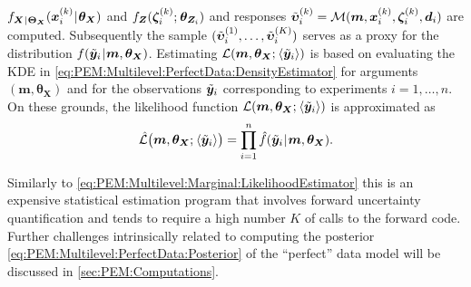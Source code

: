 \(f_{\bm{X} {\:\!}|{\:\!} \bm{\Theta}_{\bm{X}}}(\bm{x}_i^{(k)} {\:\!}|{\:\!} \bm{\theta}_{\bm{X}})\) and \(f_{\bm{Z}}(\bm{\zeta}_i^{(k)} ;{\:\!} \bm{\theta}_{\bm{Z}_i})\)
and responses \(\tilde{\bm{\upsilon}}_i^{(k)} = \mathcal{M}(\bm{m},\bm{x}_i^{(k)},\bm{\zeta}_i^{(k)},\bm{d}_i)\) are computed.
Subsequently the sample \((\tilde{\bm{\upsilon}}_i^{(1)},\ldots,\tilde{\bm{\upsilon}}_i^{(K)})\) serves as a proxy for the distribution \(f (\tilde{\bm{y}}_i {\:\!}|{\:\!} \bm{m},\bm{\theta}_{\bm{X}})\).
Estimating \(\mathcal{L} (\bm{m},\bm{\theta}_{\bm{X}} ;{\:\!} \langle{\tilde{\bm{y}}_i}\rangle)\) is based on evaluating the KDE in \cref{eq:PEM:Multilevel:PerfectData:DensityEstimator}
for arguments \((\bm{m},\bm{\theta}_{\bm{X}})\) and for the observations \(\tilde{\bm{y}}_i\) corresponding to experiments \(i=1,\ldots,n\).
On these grounds, the likelihood function \(\mathcal{L} (\bm{m},\bm{\theta}_{\bm{X}} ;{\:\!} \langle{\tilde{\bm{y}}_i}\rangle)\) is approximated as
\begin{equation} \label{eq:PEM:Multilevel:PerfectData:LikelihoodEstimator}
  \hat{\mathcal{L}} \big( \bm{m},\bm{\theta}_{\bm{X}} ;{\:\!} \langle{\tilde{\bm{y}}_i}\rangle \big)
  = \prod\limits_{i=1}^n \hat{f} (\tilde{\bm{y}}_i {\:\!}|{\:\!} \bm{m},\bm{\theta}_{\bm{X}}).
\end{equation}
\par %
Similarly to \cref{eq:PEM:Multilevel:Marginal:LikelihoodEstimator} this is an expensive statistical estimation program
that involves forward uncertainty quantification and tends to require a high number \(K\) of calls to the forward code.
Further challenges intrinsically related to computing the posterior \cref{eq:PEM:Multilevel:PerfectData:Posterior} of the ``perfect'' data model will be discussed in \cref{sec:PEM:Computations}.